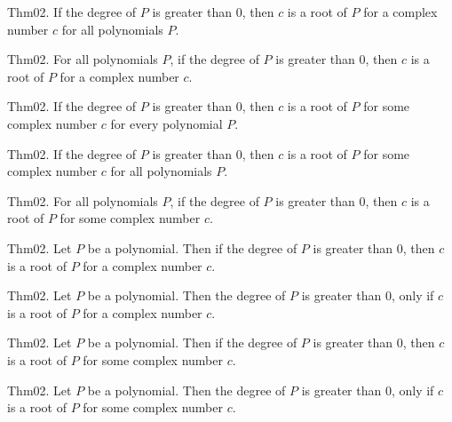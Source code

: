 \documentclass{article}
\begin{document}
Thm02. If the degree of $P$ is greater than $0$, then $c$ is a root of $P$ for a complex number $c$ for all polynomials $P$.

Thm02. For all polynomials $P$, if the degree of $P$ is greater than $0$, then $c$ is a root of $P$ for a complex number $c$.

Thm02. If the degree of $P$ is greater than $0$, then $c$ is a root of $P$ for some complex number $c$ for every polynomial $P$.

Thm02. If the degree of $P$ is greater than $0$, then $c$ is a root of $P$ for some complex number $c$ for all polynomials $P$.

Thm02. For all polynomials $P$, if the degree of $P$ is greater than $0$, then $c$ is a root of $P$ for some complex number $c$.

Thm02. Let $P$ be a polynomial. Then if the degree of $P$ is greater than $0$, then $c$ is a root of $P$ for a complex number $c$.

Thm02. Let $P$ be a polynomial. Then the degree of $P$ is greater than $0$, only if $c$ is a root of $P$ for a complex number $c$.

Thm02. Let $P$ be a polynomial. Then if the degree of $P$ is greater than $0$, then $c$ is a root of $P$ for some complex number $c$.

Thm02. Let $P$ be a polynomial. Then the degree of $P$ is greater than $0$, only if $c$ is a root of $P$ for some complex number $c$.
\end{document}
